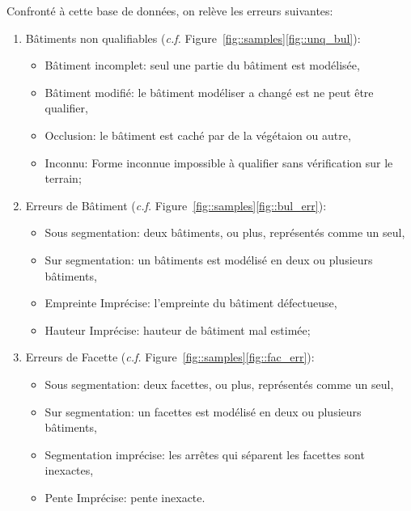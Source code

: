 \documentclass[a4paper,french]{article}
\begin{document}
    Confronté à cette base de données, on relève les erreurs suivantes:

    \begin{enumerate}[label= (\roman*).]
        \item Bâtiments non qualifiables (\textit{c.f.} Figure~\ref{fig::samples}\ref{fig::unq_bul}):
        \begin{itemize}
            \item Bâtiment incomplet: seul une partie du bâtiment est modélisée,
            \item Bâtiment modifié: le bâtiment modéliser a changé est ne peut être qualifier,
            \item Occlusion: le bâtiment est caché par de la végétaion ou autre,
            \item Inconnu: Forme inconnue impossible à qualifier sans vérification sur le terrain;
        \end{itemize}
        \item Erreurs de Bâtiment (\textit{c.f.} Figure~\ref{fig::samples}\ref{fig::bul_err}):
        \begin{itemize}
            \item Sous segmentation: deux bâtiments, ou plus, représentés comme un seul,
            \item Sur segmentation: un bâtiments est modélisé en deux ou plusieurs bâtiments,
            \item Empreinte Imprécise: l'empreinte du bâtiment défectueuse,
            \item Hauteur Imprécise: hauteur de bâtiment mal estimée;
        \end{itemize}
        \item Erreurs de Facette (\textit{c.f.} Figure~\ref{fig::samples}\ref{fig::fac_err}):
        \begin{itemize}
            \item Sous segmentation: deux facettes, ou plus, représentés comme un seul,
            \item Sur segmentation: un facettes est modélisé en deux ou plusieurs bâtiments,
            \item Segmentation imprécise: les arrêtes qui séparent les facettes sont inexactes,
            \item Pente Imprécise: pente inexacte.
        \end{itemize}
    \end{enumerate}
\end{document}
